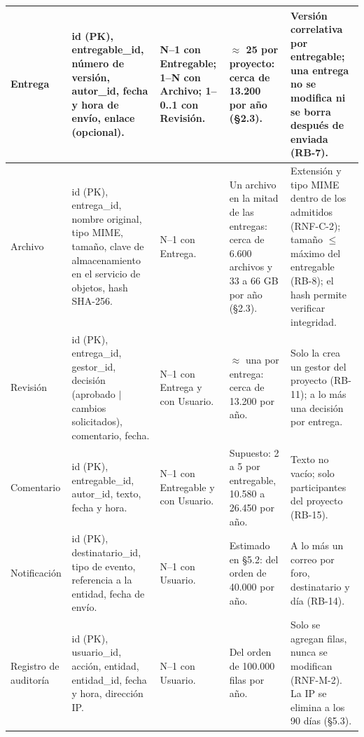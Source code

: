 \documentclass[10pt,a4paper]{article}
\begin{document}
\begin{xltabular}{\linewidth}{|P{2.4cm}|L|P{2.9cm}|P{2.4cm}|P{3.4cm}|}
Entrega & id (PK), entregable\_id, número de versión, autor\_id, fecha y hora de envío, enlace (opcional). & N–1 con Entregable; 1–N con Archivo; 1–0..1 con Revisión. & $\approx$ 25 por proyecto: cerca de 13.200 por año (§2.3). & Versión correlativa por entregable; una entrega no se modifica ni se borra después de enviada (RB-7). \\ \hline

Archivo & id (PK), entrega\_id, nombre original, tipo MIME, tamaño, clave de almacenamiento en el servicio de objetos, hash SHA-256. & N–1 con Entrega. & Un archivo en la mitad de las entregas: cerca de 6.600 archivos y 33 a 66 GB por año (§2.3). & Extensión y tipo MIME dentro de los admitidos (RNF-C-2); tamaño $\le$ máximo del entregable (RB-8); el hash permite verificar integridad. \\ \hline

Revisión & id (PK), entrega\_id, gestor\_id, decisión (aprobado $|$ cambios solicitados), comentario, fecha. & N–1 con Entrega y con Usuario. & $\approx$ una por entrega: cerca de 13.200 por año. & Solo la crea un gestor del proyecto (RB-11); a lo más una decisión por entrega. \\ \hline

Comentario & id (PK), entregable\_id, autor\_id, texto, fecha y hora. & N–1 con Entregable y con Usuario. & Supuesto: 2 a 5 por entregable, 10.580 a 26.450 por año. & Texto no vacío; solo participantes del proyecto (RB-15). \\ \hline

Notificación & id (PK), destinatario\_id, tipo de evento, referencia a la entidad, fecha de envío. & N–1 con Usuario. & Estimado en §5.2: del orden de 40.000 por año. & A lo más un correo por foro, destinatario y día (RB-14). \\ \hline

Registro de auditoría & id (PK), usuario\_id, acción, entidad, entidad\_id, fecha y hora, dirección IP. & N–1 con Usuario. & Del orden de 100.000 filas por año. & Solo se agregan filas, nunca se modifican (RNF-M-2). La IP se elimina a los 90 días (§5.3). \\ \hline

\end{xltabular}
\end{document}
